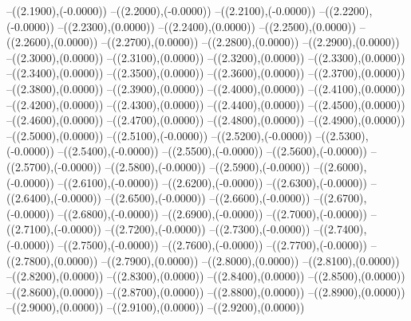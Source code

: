 {	--({\sx*(2.1900)},{\sy*(-0.0000)})
	--({\sx*(2.2000)},{\sy*(-0.0000)})
	--({\sx*(2.2100)},{\sy*(-0.0000)})
	--({\sx*(2.2200)},{\sy*(-0.0000)})
	--({\sx*(2.2300)},{\sy*(0.0000)})
	--({\sx*(2.2400)},{\sy*(0.0000)})
	--({\sx*(2.2500)},{\sy*(0.0000)})
	--({\sx*(2.2600)},{\sy*(0.0000)})
	--({\sx*(2.2700)},{\sy*(0.0000)})
	--({\sx*(2.2800)},{\sy*(0.0000)})
	--({\sx*(2.2900)},{\sy*(0.0000)})
	--({\sx*(2.3000)},{\sy*(0.0000)})
	--({\sx*(2.3100)},{\sy*(0.0000)})
	--({\sx*(2.3200)},{\sy*(0.0000)})
	--({\sx*(2.3300)},{\sy*(0.0000)})
	--({\sx*(2.3400)},{\sy*(0.0000)})
	--({\sx*(2.3500)},{\sy*(0.0000)})
	--({\sx*(2.3600)},{\sy*(0.0000)})
	--({\sx*(2.3700)},{\sy*(0.0000)})
	--({\sx*(2.3800)},{\sy*(0.0000)})
	--({\sx*(2.3900)},{\sy*(0.0000)})
	--({\sx*(2.4000)},{\sy*(0.0000)})
	--({\sx*(2.4100)},{\sy*(0.0000)})
	--({\sx*(2.4200)},{\sy*(0.0000)})
	--({\sx*(2.4300)},{\sy*(0.0000)})
	--({\sx*(2.4400)},{\sy*(0.0000)})
	--({\sx*(2.4500)},{\sy*(0.0000)})
	--({\sx*(2.4600)},{\sy*(0.0000)})
	--({\sx*(2.4700)},{\sy*(0.0000)})
	--({\sx*(2.4800)},{\sy*(0.0000)})
	--({\sx*(2.4900)},{\sy*(0.0000)})
	--({\sx*(2.5000)},{\sy*(0.0000)})
	--({\sx*(2.5100)},{\sy*(-0.0000)})
	--({\sx*(2.5200)},{\sy*(-0.0000)})
	--({\sx*(2.5300)},{\sy*(-0.0000)})
	--({\sx*(2.5400)},{\sy*(-0.0000)})
	--({\sx*(2.5500)},{\sy*(-0.0000)})
	--({\sx*(2.5600)},{\sy*(-0.0000)})
	--({\sx*(2.5700)},{\sy*(-0.0000)})
	--({\sx*(2.5800)},{\sy*(-0.0000)})
	--({\sx*(2.5900)},{\sy*(-0.0000)})
	--({\sx*(2.6000)},{\sy*(-0.0000)})
	--({\sx*(2.6100)},{\sy*(-0.0000)})
	--({\sx*(2.6200)},{\sy*(-0.0000)})
	--({\sx*(2.6300)},{\sy*(-0.0000)})
	--({\sx*(2.6400)},{\sy*(-0.0000)})
	--({\sx*(2.6500)},{\sy*(-0.0000)})
	--({\sx*(2.6600)},{\sy*(-0.0000)})
	--({\sx*(2.6700)},{\sy*(-0.0000)})
	--({\sx*(2.6800)},{\sy*(-0.0000)})
	--({\sx*(2.6900)},{\sy*(-0.0000)})
	--({\sx*(2.7000)},{\sy*(-0.0000)})
	--({\sx*(2.7100)},{\sy*(-0.0000)})
	--({\sx*(2.7200)},{\sy*(-0.0000)})
	--({\sx*(2.7300)},{\sy*(-0.0000)})
	--({\sx*(2.7400)},{\sy*(-0.0000)})
	--({\sx*(2.7500)},{\sy*(-0.0000)})
	--({\sx*(2.7600)},{\sy*(-0.0000)})
	--({\sx*(2.7700)},{\sy*(-0.0000)})
	--({\sx*(2.7800)},{\sy*(0.0000)})
	--({\sx*(2.7900)},{\sy*(0.0000)})
	--({\sx*(2.8000)},{\sy*(0.0000)})
	--({\sx*(2.8100)},{\sy*(0.0000)})
	--({\sx*(2.8200)},{\sy*(0.0000)})
	--({\sx*(2.8300)},{\sy*(0.0000)})
	--({\sx*(2.8400)},{\sy*(0.0000)})
	--({\sx*(2.8500)},{\sy*(0.0000)})
	--({\sx*(2.8600)},{\sy*(0.0000)})
	--({\sx*(2.8700)},{\sy*(0.0000)})
	--({\sx*(2.8800)},{\sy*(0.0000)})
	--({\sx*(2.8900)},{\sy*(0.0000)})
	--({\sx*(2.9000)},{\sy*(0.0000)})
	--({\sx*(2.9100)},{\sy*(0.0000)})
	--({\sx*(2.9200)},{\sy*(0.0000)})
}
